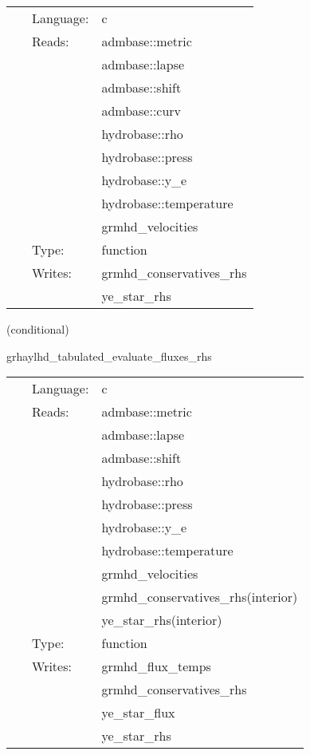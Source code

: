  \begin{tabular*}{160mm}{cll} 
~ & Language:  & c \\ 
~ & Reads:  & admbase::metric \\ 
~& ~ &admbase::lapse\\ 
~& ~ &admbase::shift\\ 
~& ~ &admbase::curv\\ 
~& ~ &hydrobase::rho\\ 
~& ~ &hydrobase::press\\ 
~& ~ &hydrobase::y\_e\\ 
~& ~ &hydrobase::temperature\\ 
~& ~ &grmhd\_velocities\\ 
~ & Type:  & function \\ 
~ & Writes:  & grmhd\_conservatives\_rhs \\ 
~& ~ &ye\_star\_rhs\\ 
\end{tabular*} 


\vspace{5mm}

   (conditional) 

\hspace{5mm} grhaylhd\_tabulated\_evaluate\_fluxes\_rhs 

\hspace{5mm}{\it tabulated version of grhaylhd\_evaluate\_fluxes\_rhs } 


\hspace{5mm}

 \begin{tabular*}{160mm}{cll} 
~ & Language:  & c \\ 
~ & Reads:  & admbase::metric \\ 
~& ~ &admbase::lapse\\ 
~& ~ &admbase::shift\\ 
~& ~ &hydrobase::rho\\ 
~& ~ &hydrobase::press\\ 
~& ~ &hydrobase::y\_e\\ 
~& ~ &hydrobase::temperature\\ 
~& ~ &grmhd\_velocities\\ 
~& ~ &grmhd\_conservatives\_rhs(interior)\\ 
~& ~ &ye\_star\_rhs(interior)\\ 
~ & Type:  & function \\ 
~ & Writes:  & grmhd\_flux\_temps \\ 
~& ~ &grmhd\_conservatives\_rhs\\ 
~& ~ &ye\_star\_flux\\ 
~& ~ &ye\_star\_rhs\\ 
\end{tabular*} 


